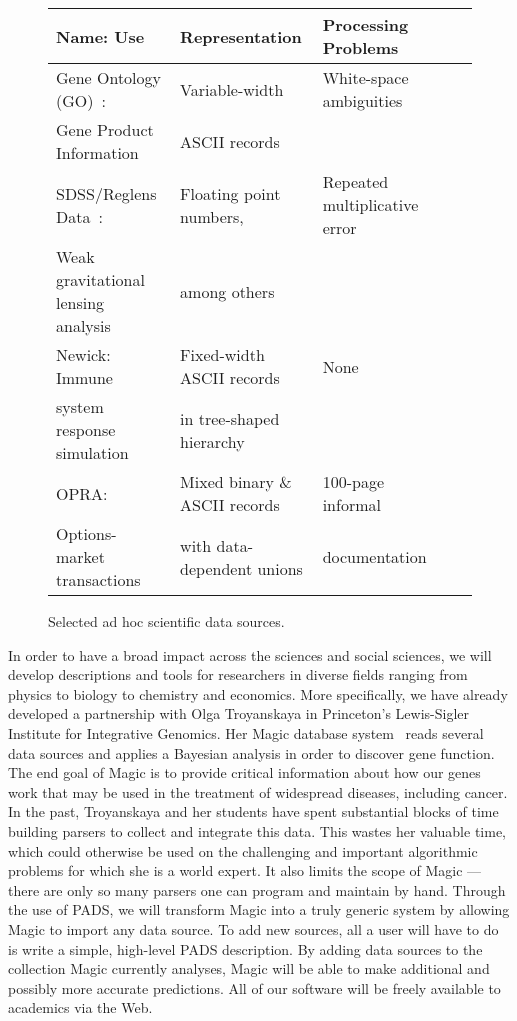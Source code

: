 \documentclass[10pt]{article}
\begin{document}
\begin{figure*}
\begin{center}
\begin{tabular}{@{}|l|l|l|l|l|}
\hline
Name: Use                           & Representation    & Processing Problems \\ \hline\hline
Gene Ontology (GO)~\cite{geneontology}:                  & Variable-width    & White-space ambiguities \\
Gene Product Information 	      & ASCII records &  \\ \hline
SDSS/Reglens Data~\cite{mandelbaum+:reglens}:                & Floating point numbers, & Repeated multiplicative error \\
Weak gravitational lensing analysis   & among others & \\ \hline
Newick:   Immune                    & Fixed-width ASCII records & None \\ 
system response simulation          & in tree-shaped hierarchy &\\ \hline                                
OPRA:                               & Mixed binary \& ASCII records 
                                                       & 100-page informal \\
Options-market transactions         & with data-dependent unions & documentation \\ \hline
\end{tabular}
\caption{Selected ad hoc scientific data sources.}
\label{figure:scientific-data-sources}
\end{center}
\end{figure*}


In order to have a broad impact across the sciences and social sciences,
we will develop descriptions and tools for researchers in diverse fields ranging from
physics to biology to chemistry and economics.
More specifically, we have already developed a partnership with
Olga Troyanskaya in Princeton's Lewis-Sigler Institute for 
Integrative Genomics.  Her Magic database system~\cite{magic}
reads several data sources
and applies a Bayesian analysis in order to discover gene function.
The end goal of Magic is to provide critical information about how
our genes work that may be used in the treatment of widespread diseases,
including cancer.
In the past, Troyanskaya and her students have spent
substantial blocks of time building parsers to collect and integrate
this data.  This wastes her valuable time, which could otherwise be
used on the challenging and important algorithmic problems for which
she is a world expert.  It also limits the scope of Magic --- there are
only so many parsers one can program and maintain by hand.
Through the use of PADS, we will transform Magic into a truly generic
system by allowing Magic to import any data source.  To add new sources,
all a user will have to do is write a simple, high-level PADS description.
By adding data sources to the collection Magic
currently analyses, Magic will be able to make additional and possibly more
accurate predictions.  All of our software will
be freely available to academics via the Web.
\end{document}

